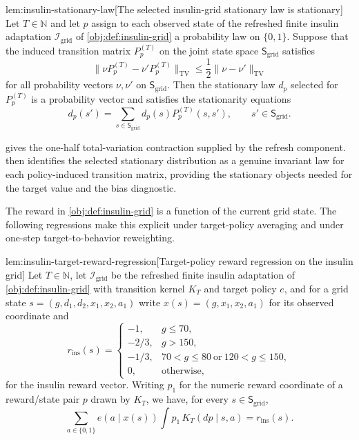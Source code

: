 \begin{lemmav}{lem:insulin-stationary-law}[The selected insulin-grid stationary law is stationary]
Let \(T\in\mathbb N\) and let \(p\) assign to each observed state of the refreshed finite insulin adaptation \(\mathcal I_{\mathrm{grid}}\) of \cref{obj:def:insulin-grid} a probability law on \(\{0,1\}\). Suppose that the induced transition matrix \(P_p^{(T)}\) on the joint state space \(\mathsf S_{\mathrm{grid}}\) satisfies
\[
\|\nu P_p^{(T)}-\nu'P_p^{(T)}\|_{\mathrm{TV}}\le\frac12\|\nu-\nu'\|_{\mathrm{TV}}
\]
for all probability vectors \(\nu,\nu'\) on \(\mathsf S_{\mathrm{grid}}\). Then the stationary law \(d_p\) selected for \(P_p^{(T)}\) is a probability vector and satisfies the stationarity equations
\[
d_p(s')=\sum_{s\in\mathsf S_{\mathrm{grid}}}d_p(s)P_p^{(T)}(s,s'),
\qquad s'\in\mathsf S_{\mathrm{grid}} .
\]
\end{lemmav}

 gives the one-half total-variation contraction supplied by the refresh component.  then identifies the selected stationary distribution as a genuine invariant law for each policy-induced transition matrix, providing the stationary objects needed for the target value and the bias diagnostic.

The reward in \cref{obj:def:insulin-grid} is a function of the current grid state. The following regressions make this explicit under target-policy averaging and under one-step target-to-behavior reweighting.

\begin{lemmav}{lem:insulin-target-reward-regression}[Target-policy reward regression on the insulin grid]
Let \(T\in\mathbb N\), let \(\mathcal I_{\mathrm{grid}}\) be the refreshed finite insulin adaptation of \cref{obj:def:insulin-grid} with transition kernel \(K_T\) and target policy \(e\), and for a grid state \(s=(g,d_1,d_2,x_1,x_2,a_1)\) write \(x(s)=(g,x_1,x_2,a_1)\) for its observed coordinate and
\[
r_{\mathrm{ins}}(s)=
\begin{cases}
-1,&g\le70,\\
-2/3,&g>150,\\
-1/3,&70<g\le80\ \text{or}\ 120<g\le150,\\
0,&\text{otherwise},
\end{cases}
\]
for the insulin reward vector. Writing \(p_1\) for the numeric reward coordinate of a reward/state pair \(p\) drawn by \(K_T\), we have, for every \(s\in\mathsf S_{\mathrm{grid}}\),
\[
\sum_{a\in\{0,1\}}e(a\mid x(s))\int p_1\,K_T(dp\mid s,a)
=
r_{\mathrm{ins}}(s) .
\]
\end{lemmav}

